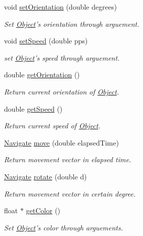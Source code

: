 \begin{DoxyCompactItemize}
void \hyperlink{classObject_a9c0c9ea4d4168ba6775ec8d4ce0d980a}{set\-Orientation} (double degrees)
\begin{DoxyCompactList}\small\item\em Set \hyperlink{classObject}{Object}'s orientation through arguement. \end{DoxyCompactList}\item 
void \hyperlink{classObject_a68f33643bbd5fe7410f4f367433010b3}{set\-Speed} (double pps)
\begin{DoxyCompactList}\small\item\em set \hyperlink{classObject}{Object}'s speed through arguement. \end{DoxyCompactList}\item 
double \hyperlink{classObject_a138712103a66b8d7268ef839464a1262}{get\-Orientation} ()
\begin{DoxyCompactList}\small\item\em Return current orientation of \hyperlink{classObject}{Object}. \end{DoxyCompactList}\item 
double \hyperlink{classObject_a407ec2b4aaa93429355c58e8d4a3d138}{get\-Speed} ()
\begin{DoxyCompactList}\small\item\em Return current speed of \hyperlink{classObject}{Object}. \end{DoxyCompactList}\item 
\hyperlink{structNavigate}{Navigate} \hyperlink{classObject_a4082c792274872b764ce5b271e1bcb9d}{move} (double elapsed\-Time)
\begin{DoxyCompactList}\small\item\em Return movement vector in elapsed time. \end{DoxyCompactList}\item 
\hyperlink{structNavigate}{Navigate} \hyperlink{classObject_aaca6dc786800652d76bbf26672a8d0c9}{rotate} (double d)
\begin{DoxyCompactList}\small\item\em Return movement vector in certain degree. \end{DoxyCompactList}\item 
float $\ast$ \hyperlink{classObject_a881b6317e1cb3a907a46875bfb91949a}{get\-Color} ()
\begin{DoxyCompactList}\small\item\em Set \hyperlink{classObject}{Object}'s color through arguements. \end{DoxyCompactList}\item 

\end{DoxyCompactItemize}
